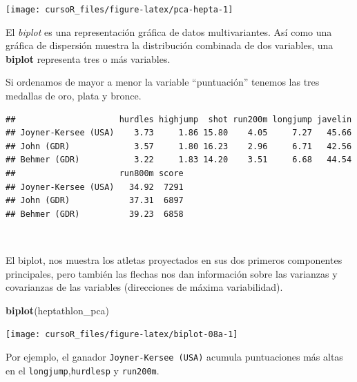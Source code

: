 \documentclass[]{book}
\newenvironment{Shaded}{\begin{snugshade}}{\end{snugshade}}
\newcommand{\KeywordTok}[1]{\textcolor[rgb]{0.13,0.29,0.53}{\textbf{#1}}}
\newcommand{\DataTypeTok}[1]{\textcolor[rgb]{0.13,0.29,0.53}{#1}}
\newcommand{\DecValTok}[1]{\textcolor[rgb]{0.00,0.00,0.81}{#1}}
\newcommand{\OtherTok}[1]{\textcolor[rgb]{0.56,0.35,0.01}{#1}}
\newcommand{\OperatorTok}[1]{\textcolor[rgb]{0.81,0.36,0.00}{\textbf{#1}}}
\newcommand{\NormalTok}[1]{#1}
\begin{document}
\begin{center}\texttt{[image: cursoR\_files/figure-latex/pca-hepta-1]} \end{center}

El \emph{biplot} es una representación gráfica de datos multivariantes.
Así como una gráfica de dispersión muestra la distribución combinada de
dos variables, una \textbf{biplot} representa tres o más variables.

Si ordenamos de mayor a menor la variable ``puntuación'' tenemos las
tres medallas de oro, plata y bronce.

\begin{Shaded}
\end{Shaded}

\begin{verbatim}
##                     hurdles highjump  shot run200m longjump javelin
## Joyner-Kersee (USA)    3.73     1.86 15.80    4.05     7.27   45.66
## John (GDR)             3.57     1.80 16.23    2.96     6.71   42.56
## Behmer (GDR)           3.22     1.83 14.20    3.51     6.68   44.54
##                     run800m score
## Joyner-Kersee (USA)   34.92  7291
## John (GDR)            37.31  6897
## Behmer (GDR)          39.23  6858
\end{verbatim}

~

El biplot, nos muestra los atletas proyectados en sus dos primeros
componentes principales, pero también las flechas nos dan información
sobre las varianzas y covarianzas de las variables (direcciones de
máxima variabilidad).

\begin{Shaded}
\begin{Highlighting}[]
\KeywordTok{biplot}\NormalTok{(heptathlon_pca)}
\end{Highlighting}
\end{Shaded}

\begin{center}\texttt{[image: cursoR\_files/figure-latex/biplot-08a-1]} \end{center}

Por ejemplo, el ganador \texttt{Joyner-Kersee\ (USA)} acumula
puntuaciones más altas en el \texttt{longjump},\texttt{hurdlesp} y
\texttt{run200m}.
\end{document}
